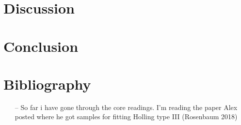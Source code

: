 \documentclass[11pt]{article}
\begin{document}
  \section{Discussion}

  \section{Conclusion}

  \section{Bibliography}
  \begin{itemize}
    \item[--] So far i have gone through the core readings. I'm reading the paper Alex posted where he got samples for fitting Holling type III (Rosenbaum 2018)
  \end{itemize}
\end{document}
